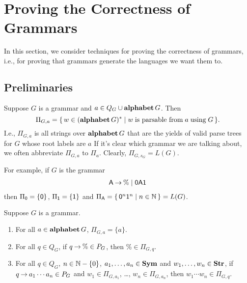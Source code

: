 \section{Proving the Correctness of Grammars}
\label{ProvingTheCorrectnessOfGrammars}

In this section, we consider techniques for proving the correctness of
grammars, i.e., for proving that grammars generate the languages we want
them to.

\subsection{Preliminaries}

Suppose $G$ is a grammar and $a\in Q_G\cup\mathbf{alphabet}\,G$.  Then
\begin{displaymath}
\Pi_{G,a}=\{ \, w\in(\mathbf{alphabet}\,G)^* \mid w \;\allowbreak\mbox{is parsable from}\allowbreak\; a
  \;\allowbreak\mbox{using}\allowbreak\; G \, \} .  
\end{displaymath}
I.e., $\Pi_{G,a}$ is all strings over $\mathbf{alphabet}\,G$ that are the
yields of valid parse trees for $G$ whose root labels are $a$ If it's
clear which grammar we are talking about, we often abbreviate
$\Pi_{G,a}$ to $\Pi_a$.  Clearly, $\Pi_{G,s_G} = L(G)$.

For example, if $G$ is the grammar
\begin{gather*}
  \mathsf{A} \mathbin{\to} \% \mid \mathsf{0}\mathsf{A}\mathsf{1}
\end{gather*}
then $\Pi_{\mathsf{0}}=\{\mathsf{0}\}$, $\Pi_{\mathsf{1}}=\{\mathsf{1}\}$ and $\Pi_{\mathsf{A}}=
\{ \, \mathsf{0}^n\mathsf{1}^n \mid n\in\mathbb{N} \, \}= L(G)$.

\begin{proposition}
\label{PiProp}
Suppose $G$ is a grammar.
\begin{enumerate}[\quad(1)]
\item For all $a\in\mathbf{alphabet}\,G$, $\Pi_{G,a}=\{a\}$.

\item For all $q\in Q_G$, if $q\mathbin{\to}\%\in P_G$, then
  ${\%}\in\Pi_{G,q}$.

\item For all $q\in Q_G$, $n\in\mathbb{N}-\{0\}$, $a_1,\ldots,a_n\in\mathbf{Sym}$
  and $w_1,\ldots,w_n\in\mathbf{Str}$, if $q\mathbin{\to} a_1\cdots a_n\in P_G$ and
  $w_1\in\Pi_{G,a_1}$, \ldots, $w_n\in\Pi_{G,a_n}$, then
  ${w_1\cdots w_n}\in\Pi_{G,q}$.
\end{enumerate}
\end{proposition}

